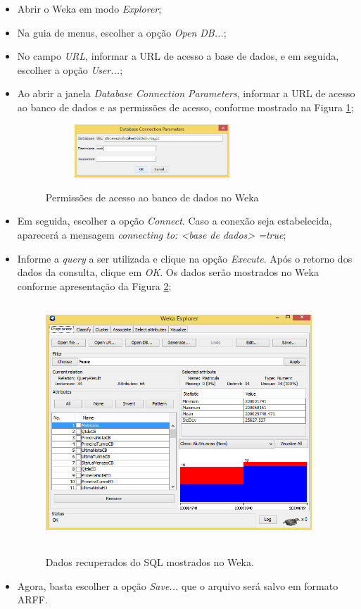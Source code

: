 \begin{itemize}
	\item Abrir o Weka em modo \textit{Explorer};
	\item Na guia de menus, escolher a opção \textit{Open DB...};
	\item No campo \textit{URL}, informar a URL de acesso a base de dados, e em seguida, escolher a opção \textit{User...};
	\item Ao abrir a janela \textit{Database Connection Parameters}, informar a URL de acesso ao banco de dados e as permissões de acesso, conforme mostrado na Figura \ref{weka5};
	
	 \begin{figure}[!h]
	 	\centering
	 	{\includegraphics[width=8cm, height=2cm]{images/weka5}}
	 	\caption {Permissões de acesso ao banco de dados no Weka}
	 	\label{weka5}
	 \end{figure}
	
	\item  Em seguida, escolher a opção \textit{Connect}. Caso a conexão seja estabelecida, aparecerá a mensagem \textit{connecting to: <base de dados> =true};
	\item Informe a \textit{query} a ser utilizada e clique na opção \textit{Execute}. Após o retorno dos dados da consulta, clique em \textit{OK}. Os dados serão mostrados no Weka conforme apresentação da Figura \ref{weka6};
	
		 \begin{figure}[!h]
		 	\centering
		 	{\includegraphics[width=10cm, height=9cm]{images/weka6}}
		 	\caption {Dados recuperados do SQL mostrados no Weka.}
		 	\label{weka6}
		 \end{figure}
	
	\item Agora, basta escolher a opção \textit{Save...} que o arquivo será salvo em formato ARFF.
\end{itemize}

